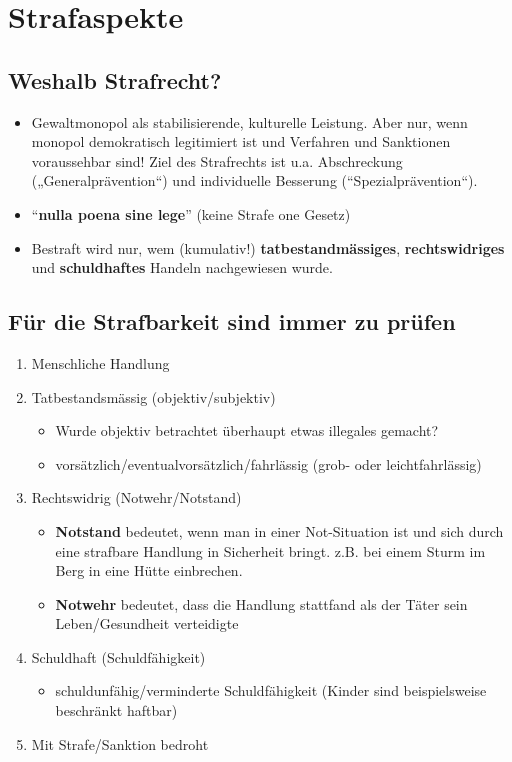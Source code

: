\section{Strafaspekte}

\subsection{Weshalb Strafrecht?}

\begin{itemize}
	\tightlist
	\item Gewaltmonopol als stabilisierende, kulturelle Leistung. Aber nur, wenn
	monopol demokratisch legitimiert ist und Verfahren und Sanktionen
	voraussehbar sind! Ziel des Strafrechts ist u.a. Abschreckung
	(„Generalprävention``) und individuelle Besserung
	(``Spezialprävention``).
	\item ``\textbf{nulla poena sine lege}'' (keine Strafe one Gesetz)
	\item Bestraft wird nur, wem (kumulativ!) \textbf{tatbestandmässiges},
	\textbf{rechtswidriges} und \textbf{schuldhaftes} Handeln nachgewiesen
	wurde.
\end{itemize}

\subsection{Für die Strafbarkeit sind immer zu prüfen}

\begin{enumerate}
	\tightlist
	\item Menschliche Handlung
	\item Tatbestandsmässig (objektiv/subjektiv)
	\begin{itemize}
		\tightlist
		\item Wurde objektiv betrachtet überhaupt etwas illegales gemacht?
		\item vorsätzlich/eventualvorsätzlich/fahrlässig (grob- oder
		leichtfahrlässig)
	\end{itemize}
	\item Rechtswidrig (Notwehr/Notstand)
	\begin{itemize}
		\tightlist
		\item \textbf{Notstand} bedeutet, wenn man in einer Not-Situation ist und
		sich durch eine strafbare Handlung in Sicherheit bringt. z.B. bei einem
		Sturm im Berg in eine Hütte einbrechen.
		\item \textbf{Notwehr} bedeutet, dass die Handlung stattfand als der Täter
		sein Leben/Gesundheit verteidigte
	\end{itemize}
	\item Schuldhaft (Schuldfähigkeit)
	\begin{itemize}
		\tightlist
		\item schuldunfähig/verminderte Schuldfähigkeit (Kinder sind
		beispielsweise beschränkt haftbar)
	\end{itemize}
	\item Mit Strafe/Sanktion bedroht
\end{enumerate}

